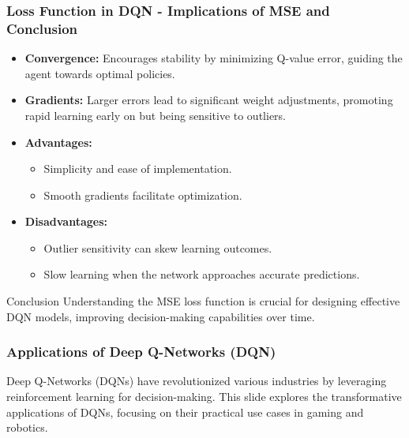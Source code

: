 \documentclass[aspectratio=169]{beamer}
\begin{document}
\begin{frame}[fragile]
    \frametitle{Loss Function in DQN - Implications of MSE and Conclusion}
    \begin{itemize}
        \item \textbf{Convergence:} Encourages stability by minimizing Q-value error, guiding the agent towards optimal policies.
        \item \textbf{Gradients:} Larger errors lead to significant weight adjustments, promoting rapid learning early on but being sensitive to outliers.
        \item \textbf{Advantages:}
        \begin{itemize}
            \item Simplicity and ease of implementation.
            \item Smooth gradients facilitate optimization.
        \end{itemize}
        \item \textbf{Disadvantages:}
        \begin{itemize}
            \item Outlier sensitivity can skew learning outcomes.
            \item Slow learning when the network approaches accurate predictions.
        \end{itemize}
    \end{itemize}

    \begin{block}{Conclusion}
        Understanding the MSE loss function is crucial for designing effective DQN models, improving decision-making capabilities over time.
    \end{block}
\end{frame}

\begin{frame}[fragile]
    \frametitle{Applications of Deep Q-Networks (DQN)}
    Deep Q-Networks (DQNs) have revolutionized various industries by leveraging reinforcement learning for decision-making. This slide explores the transformative applications of DQNs, focusing on their practical use cases in gaming and robotics.
\end{frame}
\end{document}
